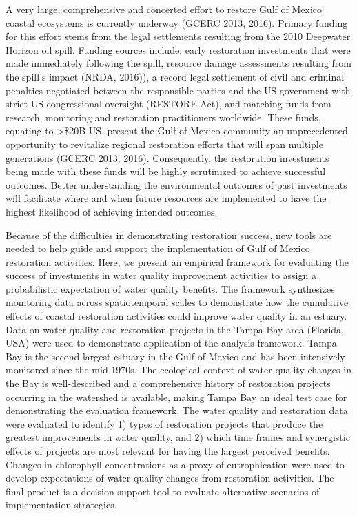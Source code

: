 \documentclass[]{article}
\begin{document}
A very large, comprehensive and concerted effort to restore Gulf of
Mexico coastal ecosystems is currently underway (GCERC 2013, 2016).
Primary funding for this effort stems from the legal settlements
resulting from the 2010 Deepwater Horizon oil spill. Funding sources
include: early restoration investments that were made immediately
following the spill, resource damage assessments resulting from the
spill's impact (NRDA, 2016)), a record legal settlement of civil and
criminal penalties negotiated between the responsible parties and the US
government with strict US congressional oversight (RESTORE Act), and
matching funds from research, monitoring and restoration practitioners
worldwide. These funds, equating to \textgreater{}\$20B US, present the
Gulf of Mexico community an unprecedented opportunity to revitalize
regional restoration efforts that will span multiple generations (GCERC
2013, 2016). Consequently, the restoration investments being made with
these funds will be highly scrutinized to achieve successful outcomes.
Better understanding the environmental outcomes of past investments will
facilitate where and when future resources are implemented to have the
highest likelihood of achieving intended outcomes.

Because of the difficulties in demonstrating restoration success, new
tools are needed to help guide and support the implementation of Gulf of
Mexico restoration activities. Here, we present an empirical framework
for evaluating the success of investments in water quality improvement
activities to assign a probabilistic expectation of water quality
benefits. The framework synthesizes monitoring data across
spatiotemporal scales to demonstrate how the cumulative effects of
coastal restoration activities could improve water quality in an
estuary. Data on water quality and restoration projects in the Tampa Bay
area (Florida, USA) were used to demonstrate application of the analysis
framework. Tampa Bay is the second largest estuary in the Gulf of Mexico
and has been intensively monitored since the mid-1970s. The ecological
context of water quality changes in the Bay is well-described and a
comprehensive history of restoration projects occurring in the watershed
is available, making Tampa Bay an ideal test case for demonstrating the
evaluation framework. The water quality and restoration data were
evaluated to identify 1) types of restoration projects that produce the
greatest improvements in water quality, and 2) which time frames and
synergistic effects of projects are most relevant for having the largest
perceived benefits. Changes in chlorophyll concentrations as a proxy of
eutrophication were used to develop expectations of water quality
changes from restoration activities. The final product is a decision
support tool to evaluate alternative scenarios of implementation
strategies.
\end{document}
